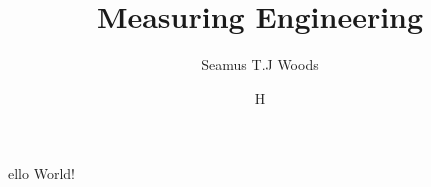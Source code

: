 \documentclass{article}
\title{Measuring Engineering}
\author{Seamus T.J Woods}
\begin{document}
\maketitle
\date

Hello World!
\end{document}
